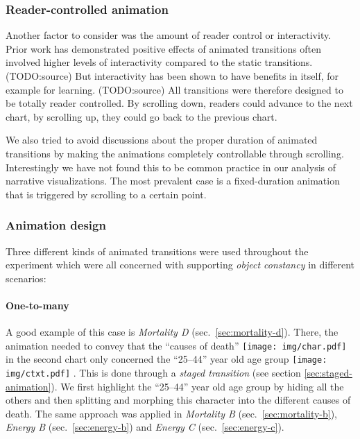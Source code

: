 \begin{flushleft}
\hypertarget{reader-controlled-animation}{%
\subsubsection{Reader-controlled
animation}\label{reader-controlled-animation}}

Another factor to consider was the amount of reader control or
interactivity. Prior work has demonstrated positive effects of animated
transitions often involved higher levels of interactivity compared to
the static transitions. (TODO:source) But interactivity has been shown
to have benefits in itself, for example for learning. (TODO:source) All
transitions were therefore designed to be totally reader controlled. By
scrolling down, readers could advance to the next chart, by scrolling
up, they could go back to the previous chart.

We also tried to avoid discussions about the proper duration of animated
transitions by making the animations completely controllable through
scrolling. Interestingly we have not found this to be common practice in
our analysis of narrative visualizations. The most prevalent case is a
fixed-duration animation that is triggered by scrolling to a certain
point.

\hypertarget{animation-design}{%
\subsubsection{Animation design}\label{animation-design}}

Three different kinds of animated transitions were used throughout the
experiment which were all concerned with supporting \emph{object
constancy} in different scenarios:

\hypertarget{one-to-many}{%
\paragraph{One-to-many}\label{one-to-many}}

A good example of this case is \emph{Mortality D}
(sec.~\ref{sec:mortality-d}). There, the animation needed to convey that
the ``causes of death'' \texttt{[image: img/char.pdf]} in the second
chart only concerned the ``25--44'' year old age group
\texttt{[image: img/ctxt.pdf]} . This is done through a \emph{staged
transition} (see section \ref{sec:staged-animation}). We first highlight
the ``25--44'' year old age group by hiding all the others and then
splitting and morphing this character into the different causes of
death. The same approach was applied in \emph{Mortality B}
(sec.~\ref{sec:mortality-b}), \emph{Energy B} (sec.~\ref{sec:energy-b})
and \emph{Energy C} (sec.~\ref{sec:energy-c}).


\end{flushleft}
